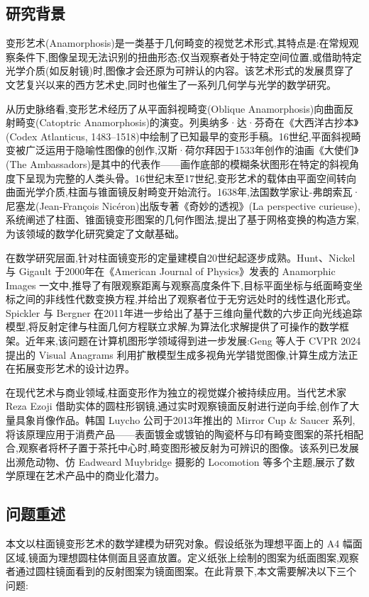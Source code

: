 \documentclass[12pt, a4paper]{ctexart}
\begin{document}
\subsection{研究背景}
变形艺术(Anamorphosis)是一类基于几何畸变的视觉艺术形式,其特点是:在常规观察条件下,图像呈现无法识别的扭曲形态;仅当观察者处于特定空间位置,或借助特定光学介质(如反射镜)时,图像才会还原为可辨认的内容。该艺术形式的发展贯穿了文艺复兴以来的西方艺术史,同时也催生了一系列几何学与光学的数学研究。

从历史脉络看,变形艺术经历了从平面斜视畸变(Oblique Anamorphosis)向曲面反射畸变(Catoptric Anamorphosis)的演变。列奥纳多·达·芬奇在《大西洋古抄本》(Codex Atlanticus, 1483–1518)中绘制了已知最早的变形手稿。16世纪,平面斜视畸变被广泛运用于隐喻性图像的创作,汉斯·荷尔拜因于1533年创作的油画《大使们》(The Ambassadors)是其中的代表作——画作底部的模糊条状图形在特定的斜视角度下呈现为完整的人类头骨。16世纪末至17世纪,变形艺术的载体由平面空间转向曲面光学介质,柱面与锥面镜反射畸变开始流行。1638年,法国数学家让-弗朗索瓦·尼塞龙(Jean-François Nicéron)出版专著《奇妙的透视》(La perspective curieuse),系统阐述了柱面、锥面镜变形图案的几何作图法,提出了基于网格变换的构造方案,为该领域的数学化研究奠定了文献基础。

在数学研究层面,针对柱面镜变形的定量建模自20世纪起逐步成熟。Hunt、Nickel 与 Gigault 于2000年在《American Journal of Physics》发表的 Anamorphic Images 一文中,推导了有限观察距离与观察高度条件下,目标平面坐标与纸面畸变坐标之间的非线性代数变换方程,并给出了观察者位于无穷远处时的线性退化形式。Spickler 与 Bergner 在2011年进一步给出了基于三维向量代数的六步正向光线追踪模型,将反射定律与柱面几何方程联立求解,为算法化求解提供了可操作的数学框架。近年来,该问题在计算机图形学领域得到进一步发展:Geng 等人于 CVPR 2024 提出的 Visual Anagrams 利用扩散模型生成多视角光学错觉图像,计算生成方法正在拓展变形艺术的设计边界。

在现代艺术与商业领域,柱面变形作为独立的视觉媒介被持续应用。当代艺术家 Reza Ezoji 借助实体的圆柱形钢镜,通过实时观察镜面反射进行逆向手绘,创作了大量具象肖像作品。韩国 Luycho 公司于2013年推出的 Mirror Cup \& Saucer 系列,将该原理应用于消费产品——表面镀金或镀铂的陶瓷杯与印有畸变图案的茶托相配合,观察者将杯子置于茶托中心时,畸变图形被反射为可辨识的图像。该系列已发展出濒危动物、仿 Eadweard Muybridge 摄影的 Locomotion 等多个主题,展示了数学原理在艺术产品中的商业化潜力。

\subsection{问题重述}
本文以柱面镜变形艺术的数学建模为研究对象。假设纸张为理想平面上的 A4 幅面区域,镜面为理想圆柱体侧面且竖直放置。定义纸张上绘制的图案为纸面图案,观察者通过圆柱镜面看到的反射图案为镜面图案。在此背景下,本文需要解决以下三个问题:
\end{document}
